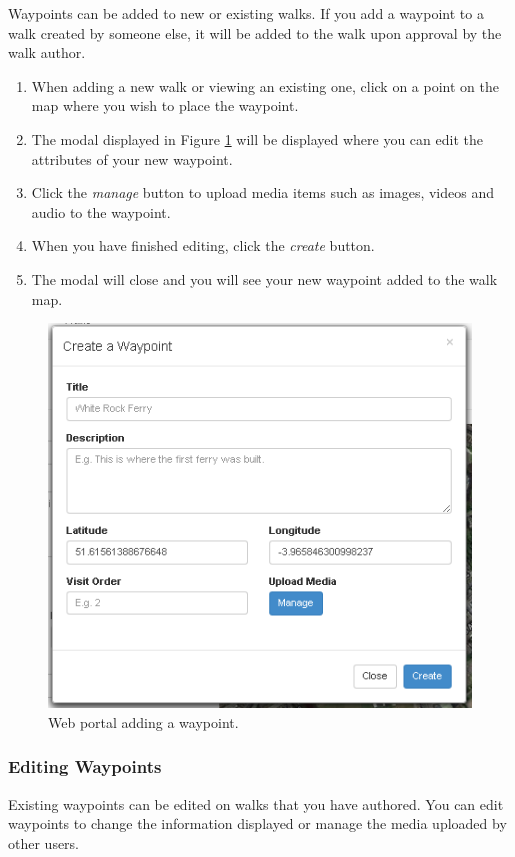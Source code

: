 \documentclass[11pt,a4paper]{report}
\begin{document}
Waypoints can be added to new or existing walks. If you add a waypoint to a walk created by someone else, it will be added to the walk upon approval by the walk author.

\begin{enumerate}
\item When adding a new walk or viewing an existing one, click on a point on the map where you wish to place the waypoint.
\item The modal displayed in Figure \ref{fig:add-waypoint-guide} will be displayed where you can edit the attributes of your new waypoint.
\item Click the \emph{manage} button to upload media items such as images, videos and audio to the waypoint.
\item When you have finished editing, click the \emph{create} button.
\item The modal will close and you will see your new waypoint added to the walk map.
\end{enumerate}

\begin{figure}[H]
\centering
\includegraphics[width=0.7\linewidth]{./img/webportal/add-waypoint}
\caption{Web portal adding a waypoint.}
\label{fig:add-waypoint-guide}
\end{figure}


\subsubsection{Editing Waypoints}

Existing waypoints can be edited on walks that you have authored. You can edit waypoints to change the information displayed or manage the media uploaded by other users.
\end{document}

